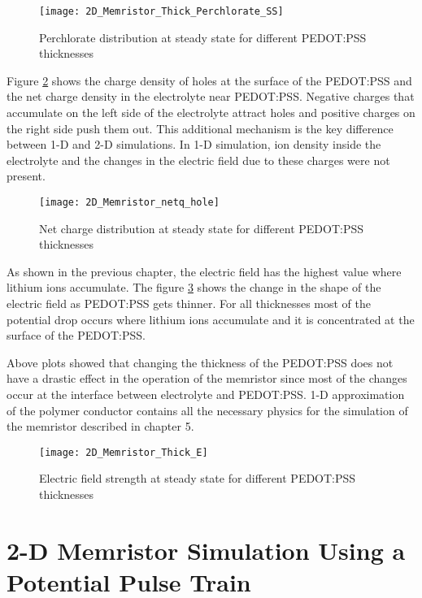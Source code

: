 \begin{doublespace}
\begin{figure}[!htp]
\centering
\texttt{[image: 2D\_Memristor\_Thick\_Perchlorate\_SS]}
\caption{Perchlorate distribution at steady state for different PEDOT:PSS thicknesses} 
\label{thick_perch_ss}
\end{figure}

Figure \ref{thick_netq_p} shows the charge density of holes at the surface of the PEDOT:PSS and the net charge density in the electrolyte near PEDOT:PSS. Negative charges that accumulate on the left side of the electrolyte attract holes and positive charges on the right side push them out. This additional mechanism is the key difference between 1-D and 2-D simulations. In 1-D simulation, ion density inside the electrolyte and the changes in the electric field due to these charges were not present.

\begin{figure}[!htp]
\centering
\texttt{[image: 2D\_Memristor\_netq\_hole]}
\caption{Net charge distribution at steady state for different PEDOT:PSS thicknesses} 
\label{thick_netq_p}
\end{figure}

As shown in the previous chapter, the electric field has the highest value where lithium ions accumulate. The figure \ref{thick_efield} shows the change in the shape of the electric field as PEDOT:PSS gets thinner. For all thicknesses most of the potential drop occurs where lithium ions accumulate and it is concentrated at the surface of the PEDOT:PSS. 

Above plots showed that changing the thickness of the PEDOT:PSS does not have a drastic effect in the operation of the memristor since most of the changes occur at the interface between electrolyte and PEDOT:PSS. 1-D approximation of the polymer conductor contains all the necessary physics for the simulation of the memristor described in chapter 5.

\begin{figure}[!htp]
\centering
\texttt{[image: 2D\_Memristor\_Thick\_E]}
\caption{Electric field strength at steady state for different PEDOT:PSS thicknesses} 
\label{thick_efield}
\end{figure}


\clearpage
\section{2-D Memristor Simulation Using a Potential Pulse Train}


\end{doublespace}
